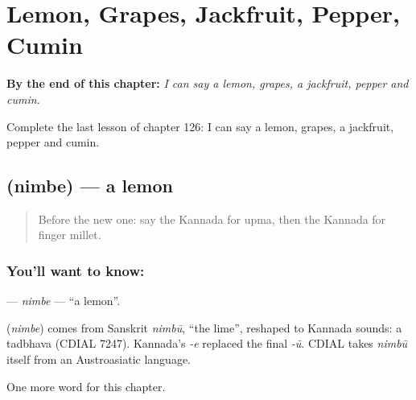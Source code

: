 
\chapter{Lemon, Grapes, Jackfruit, Pepper, Cumin}
\label{ch:ka-lemon-grapes-jackfruit-pepper-cumin}

\begin{chapteropening}
\textbf{By the end of this chapter:} \emph{I can say a lemon, grapes, a jackfruit, pepper and cumin.}

Complete the last lesson of chapter 126: I can say a lemon, grapes, a jackfruit, pepper and cumin.
\end{chapteropening}

\section[\texorpdfstring{\kn{ನಿಂಬೆ} (nimbe)}{ನಿಂಬೆ (nimbe)}]{ (nimbe) — a lemon}

\label{lesson:KA-C126-nimbe}



\begin{quote}
Before the new one: say the Kannada for upma, then the Kannada for finger millet.
\end{quote}

\subsection*{You'll want to know: }
\textbf{} — \emph{nimbe} — \textquotedblleft{}a lemon\textquotedblright{}.

\begin{cousinweb}
\textbf{} (\emph{nimbe}) comes from Sanskrit \emph{nimbū}, \textquotedblleft{}the lime\textquotedblright{}, reshaped to Kannada sounds: a tadbhava (CDIAL 7247). Kannada's \emph{-e} replaced the final \emph{-ū}. CDIAL takes \emph{nimbū} itself from an Austroasiatic language.
\end{cousinweb}

\begin{grammarlens}[title={What you've built}]
One more word for this chapter.
\end{grammarlens}

